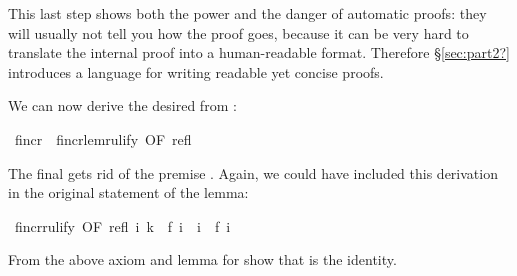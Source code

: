 \begin{isabelle}
\begin{isamarkuptext}
This last step shows both the power and the danger of automatic proofs: they
will usually not tell you how the proof goes, because it can be very hard to
translate the internal proof into a human-readable format. Therefore
\S\ref{sec:part2?} introduces a language for writing readable yet concise
proofs.

We can now derive the desired  from :%
\end{isamarkuptext}%
\ f{\isacharunderscore}incr\ {\isacharequal}\ f{\isacharunderscore}incr{\isacharunderscore}lem{\isacharbrackleft}rulify{\isacharcomma}\ OF\ refl{\isacharbrackright}%
\begin{isamarkuptext}%
\noindent
The final  gets rid of the premise . Again, we could
have included this derivation in the original statement of the lemma:%
\end{isamarkuptext}%
\ f{\isacharunderscore}incr{\isacharbrackleft}rulify{\isacharcomma}\ OF\ refl{\isacharbrackright}{\isacharcolon}\ {\isachardoublequote}{\isasymforall}i{\isachardot}\ k\ {\isacharequal}\ f\ i\ {\isasymlongrightarrow}\ i\ {\isasymle}\ f\ i{\isachardoublequote}%
\begin{isamarkuptext}%
\begin{exercise}
From the above axiom and lemma for  show that  is the identity.
\end{exercise}


\end{isamarkuptext}
\end{isabelle}
